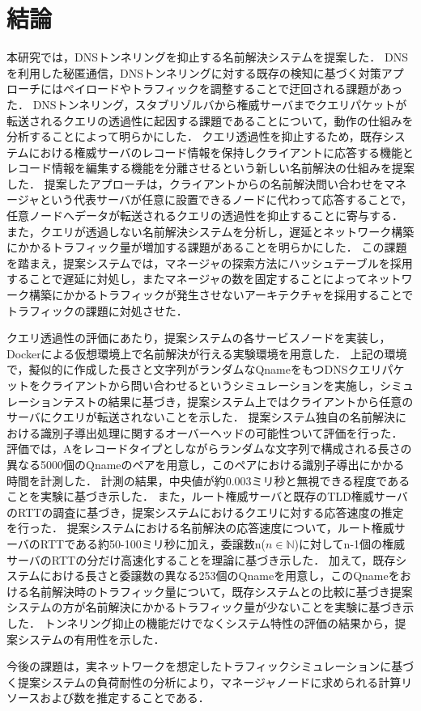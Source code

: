\section{結論}
\label{sec:conclusion}
本研究では，DNSトンネリングを抑止する名前解決システムを提案した．
DNSを利用した秘匿通信，DNSトンネリングに対する既存の検知に基づく対策アプローチにはペイロードやトラフィックを調整することで迂回される課題があった．
DNSトンネリング，スタブリゾルバから権威サーバまでクエリパケットが転送されるクエリの透過性に起因する課題であることについて，動作の仕組みを分析することによって明らかにした．
クエリ透過性を抑止するため，既存システムにおける権威サーバのレコード情報を保持しクライアントに応答する機能とレコード情報を編集する機能を分離させるという新しい名前解決の仕組みを提案した．
提案したアプローチは，クライアントからの名前解決問い合わせをマネージャという代表サーバが任意に設置できるノードに代わって応答することで，任意ノードへデータが転送されるクエリの透過性を抑止することに寄与する．
また，クエリが透過しない名前解決システムを分析し，遅延とネットワーク構築にかかるトラフィック量が増加する課題があることを明らかにした．
この課題を踏まえ，提案システムでは，マネージャの探索方法にハッシュテーブルを採用することで遅延に対処し，またマネージャの数を固定することによってネットワーク構築にかかるトラフィックが発生させないアーキテクチャを採用することでトラフィックの課題に対処させた．

クエリ透過性の評価にあたり，提案システムの各サービスノードを実装し，Dockerによる仮想環境上で名前解決が行える実験環境を用意した．
上記の環境で，擬似的に作成した長さと文字列がランダムなQnameをもつDNSクエリパケットをクライアントから問い合わせるというシミュレーションを実施し，シミュレーションテストの結果に基づき，提案システム上ではクライアントから任意のサーバにクエリが転送されないことを示した．
提案システム独自の名前解決における識別子導出処理に関するオーバーヘッドの可能性ついて評価を行った．
評価では，Aをレコードタイプとしながらランダムな文字列で構成される長さの異なる5000個のQnameのペアを用意し，このペアにおける識別子導出にかかる時間を計測した．
計測の結果，中央値が約0.003ミリ秒と無視できる程度であることを実験に基づき示した．
また，ルート権威サーバと既存のTLD権威サーバのRTTの調査に基づき，提案システムにおけるクエリに対する応答速度の推定を行った．
提案システムにおける名前解決の応答速度について，ルート権威サーバのRTTである約50-100ミリ秒に加え，委譲数n($n \in \mathbb{N}$)に対してn-1個の権威サーバのRTTの分だけ高速化することを理論に基づき示した．
加えて，既存システムにおける長さと委譲数の異なる253個のQnameを用意し，このQnameをおける名前解決時のトラフィック量について，既存システムとの比較に基づき提案システムの方が名前解決にかかるトラフィック量が少ないことを実験に基づき示した．
トンネリング抑止の機能だけでなくシステム特性の評価の結果から，提案システムの有用性を示した．

今後の課題は，実ネットワークを想定したトラフィックシミュレーションに基づく提案システムの負荷耐性の分析により，マネージャノードに求められる計算リソースおよび数を推定することである．
